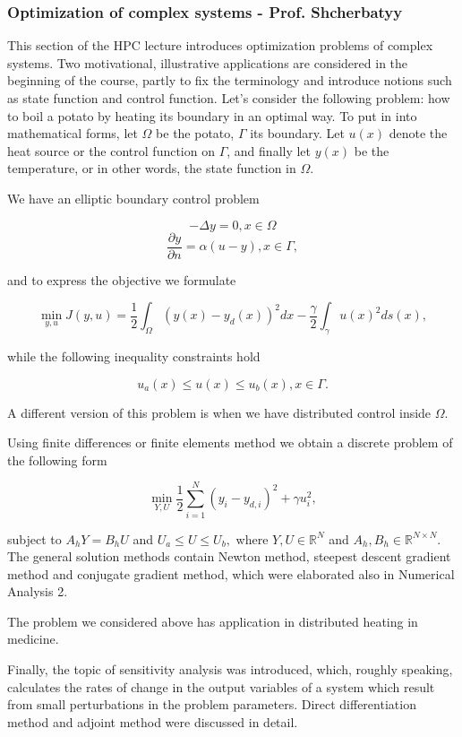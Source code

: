 \documentclass{article}
\begin{document}
\subsubsection{Optimization of complex systems - Prof. Shcherbatyy}
This section of the HPC lecture introduces optimization problems of complex systems. Two motivational, illustrative applications are considered in the beginning of the course, partly to fix the terminology and introduce notions such as state function and control function. Let's consider the following problem: how to boil a potato by heating its boundary in an optimal way. To put in into mathematical forms, let $\Omega$ be the potato, $\Gamma$ its boundary. Let $u(x)$ denote the heat source or the control function on $\Gamma$, and finally let $y(x)$ be the temperature, or in other words, the state function in $\Omega$.

We have an elliptic boundary control problem

\[ -\Delta y = 0 , x \in \Omega \]
\[ \frac{\partial y}{\partial n} = \alpha (u - y), x \in \Gamma, \]

and to express the objective we formulate

\[ \min_{y,u} J(y, u) = \frac{1}{2} \int_{\Omega} (y(x) - y_d(x))^2 dx - \frac{\gamma}{2} \int_{\gamma} {u(x)}^2 ds(x),\]

while the following inequality constraints hold

\[ u_a(x) \leq u(x) \leq u_b(x), x \in \Gamma.\]

A different version of this problem is when we have distributed control inside $\Omega$.

Using finite differences or finite elements method we obtain a discrete problem of the following form

\[ \min_{Y,U} \frac{1}{2}\sum_{i = 1} ^ {N} (y_i - y_{d,i})^2 + \gamma u_i^2,\]

subject to $A_h Y = B_h U$ and $U_a \leq U \leq U_b,$ where $Y,U \in \mathbb{R}^N$ and $A_h, B_h \in \mathbb{R}^{N \times N}$. The general solution methods contain Newton method, steepest descent gradient method and conjugate gradient method, which were elaborated also in Numerical Analysis 2.

The problem we considered above has application in distributed heating in medicine.

Finally, the topic of sensitivity analysis was introduced, which, roughly speaking, calculates the rates of change in the output variables of a system which result from small perturbations in the problem parameters. Direct differentiation method and adjoint method were discussed in detail.
\end{document}
